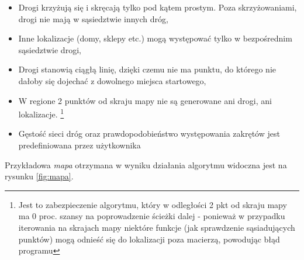 \documentclass[polish, twoside, 12pt, a4paper]{article}
\theoremstyle{definition}
\theoremstyle{plain}
\theoremstyle{remark}
\begin{document}
	\begin{itemize}
		\item Drogi krzyżują się i skręcają tylko pod kątem prostym. Poza skrzyżowaniami, drogi nie mają w sąsiedztwie innych dróg,
		\item Inne lokalizacje (domy, sklepy etc.) mogą występować tylko w bezpośrednim sąsiedztwie drogi,
		\item Drogi stanowią ciągłą linię, dzięki czemu nie ma punktu, do którego nie dałoby się dojechać z dowolnego miejsca startowego,
		\item W regione 2 punktów od skraju mapy nie są generowane ani drogi, ani lokalizacje.  \footnote{Jest to zabezpieczenie algorytmu, który w odległości 2 pkt od skraju mapy ma 0 proc. szansy na poprowadzenie ścieżki dalej - ponieważ w przypadku iterowania na skrajach mapy niektóre funkcje (jak sprawdzenie sąsiadujących punktów) mogą odnieść się do lokalizacji poza macierzą, powodując błąd programu}
	 	\item Gęstość sieci dróg oraz prawdopodobieństwo występowania zakrętów jest predefiniowana przez użytkownika
	\end{itemize}

Przykładowa \textit{mapa} otrzymana w wyniku działania algorytmu widoczna jest na rysunku \ref{fig:mapa}.
 \\
\end{document}
